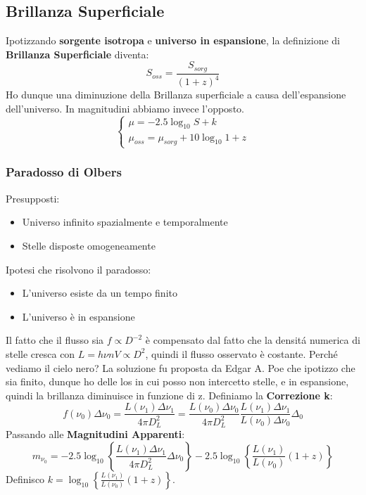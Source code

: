 \documentclass[12pt, a4paper]{article}
\begin{document}
\subsection{Brillanza Superficiale}
Ipotizzando \textbf{sorgente isotropa} e \textbf{universo in espansione}, la definizione di \textbf{Brillanza Superficiale} diventa:
\begin{equation}
    S_{oss}=\frac{S_{sorg}}{(1+z)^4}
\end{equation}
Ho dunque una diminuzione della Brillanza superficiale a  causa dell'espansione dell'universo. In magnitudini abbiamo invece l'opposto.
\begin{equation}
     \begin{cases}
        \mu=-2.5\log_{10}{S}+k
         \\
        \mu_{oss}=\mu_{sorg}+10\log_{10}{1+z}
     \end{cases}
\end{equation}
\subsubsection{Paradosso di Olbers}
Presupposti:
\begin{itemize}
    \item Universo infinito spazialmente e temporalmente
    \item Stelle disposte omogeneamente
\end{itemize}
Ipotesi che risolvono il paradosso:
\begin{itemize}
    \item L'universo esiste da un tempo finito
    \item L'universo è in espansione
\end{itemize}
Il fatto che il flusso sia $f \propto D^{-2}$ è compensato dal fatto che la densit\'{a} numerica di stelle cresca con $L= h \nu n V\propto D^2$, quindi il flusso osservato è costante. Perch\'{e} vediamo il cielo nero? La soluzione fu proposta da Edgar A. Poe che ipotizzo che sia finito, dunque ho delle los in cui posso non intercetto stelle, e in espansione, quindi la brillanza diminuisce in funzione di z.
Definiamo la \textbf{Correzione k}:
\begin{equation}
    f(\nu_0) \Delta\nu_0=\frac{L(\nu_1)\Delta\nu_1}{4\pi D_L^2}=\frac{L(\nu_0)\Delta\nu_0}{4\pi D_L^2}\frac{L(\nu_1)\Delta\nu_1}{L(\nu_0)\Delta\nu_0}\Delta_0
\end{equation}
Passando alle \textbf{Magnitudini Apparenti}:
\begin{equation}
    m_{\nu_0}=-2.5\log_{10}{\left\{\frac{L(\nu_1)\Delta\nu_1}{4\pi D_L^2}\Delta\nu_0\right\}}-2.5\log_{10}{\left\{\frac{L(\nu_1)}{L(\nu_0)}(1+z)\right\}}
\end{equation}
Definisco $k=\log_{10}{\left\{\frac{L(\nu_1)}{L(\nu_0)}(1+z)\right\}}$.
\end{document}
